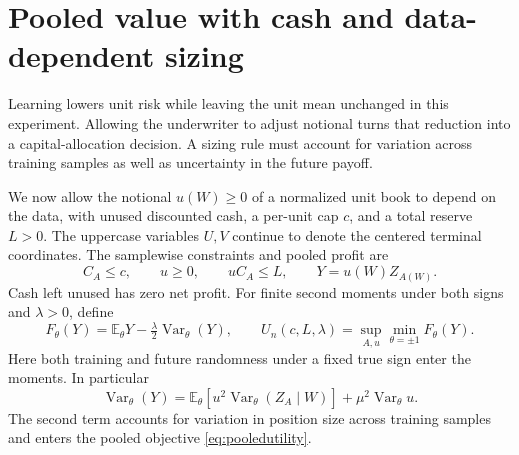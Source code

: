 \documentclass[11pt,a4paper]{amsart}
\theoremstyle{plain}
\theoremstyle{definition}
\theoremstyle{remark}
\DeclareMathOperator{\Var}{Var}
\newcommand{\EE}{\mathbb{E}}
\begin{document}
\section{Pooled value with cash and data-dependent sizing}\label{sec:pooled}

Learning lowers unit risk while leaving the unit mean unchanged in this experiment. Allowing the underwriter to adjust notional turns that reduction into a capital-allocation decision. A sizing rule must account for variation across training samples as well as uncertainty in the future payoff.

We now allow the notional $u(W)\ge0$ of a normalized unit book to depend on the data, with unused discounted cash, a per-unit cap $c$, and a total reserve $L>0$. The uppercase variables $U,V$ continue to denote the centered terminal coordinates. The samplewise constraints and pooled profit are
\begin{equation}\label{eq:twobudgets}
 C_A\le c,\qquad u\ge0,\qquad uC_A\le L,\qquad Y=u(W)Z_{A(W)}.
\end{equation}
Cash left unused has zero net profit. For finite second moments under both signs and $\lambda>0$, define
\begin{equation}\label{eq:pooledutility}
 F_\theta(Y)=\EE_\theta Y-\tfrac\lambda2\Var_\theta(Y),\qquad
 U_n(c,L,\lambda)=\sup_{A,u}\min_{\theta=\pm1}F_\theta(Y).
\end{equation}
Here both training and future randomness under a fixed true sign enter the moments. In particular
\[
 \Var_\theta(Y)=\EE_\theta[u^2\Var_\theta(Z_A\mid W)]
                         +\mu^2\Var_\theta u.
\]
The second term accounts for variation in position size across training samples and enters the pooled objective \eqref{eq:pooledutility}.
\end{document}
